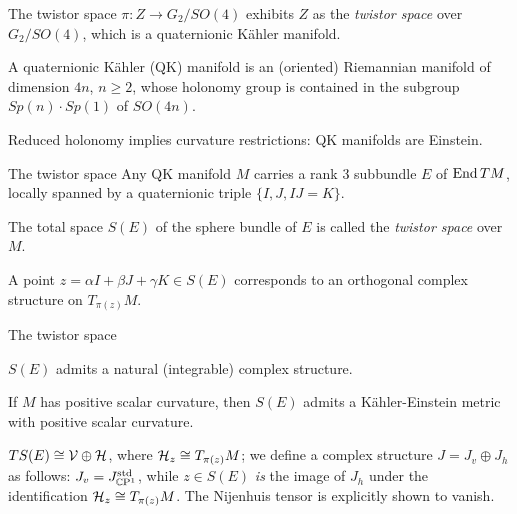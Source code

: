 \documentclass[11pt,parskip]{beamer}
\begin{document}
\begin{frame}{The twistor space}
	$\pi:Z\to G_2/SO(4)$ exhibits $Z$ as the \emph{twistor space} over $G_2/SO(4)$, which is a quaternionic K\"ahler manifold. \pause
	
	\bigskip
	
	\begin{mydef}
		A quaternionic K\"ahler (QK) manifold is an (oriented) Riemannian manifold of dimension $4n$, $n\geq 2$, whose holonomy group is contained in the subgroup $Sp(n)\cdot Sp(1)$ of $SO(4n)$.
	\end{mydef}\pause

	\bigskip

	Reduced holonomy implies curvature restrictions: QK manifolds are Einstein. 
\end{frame}

\begin{frame}{The twistor space}
	Any QK manifold $M$ carries a rank 3 subbundle $E$ of $\operatorname{End} TM$, locally spanned by a quaternionic triple $\{I,J,IJ=K\}$.\pause
	
	\medskip
	
	\begin{mydef}
		The total space $S(E)$ of the sphere bundle of $E$ is called the \emph{twistor space} over $M$.
	\end{mydef}\pause

	\medskip
	
	A point $z=\alpha I+\beta J+ \gamma K \in S(E)$ corresponds to an orthogonal complex structure on $T_{\pi(z)}M$.
\end{frame}

\begin{frame}{The twistor space}
	\begin{thm}
		\begin{numberedlist}
			\item $S(E)$ admits a natural (integrable) complex structure.
			\item If $M$ has positive scalar curvature, then $S(E)$ admits a K\"ahler-Einstein metric with positive scalar curvature.
		\end{numberedlist}
	\end{thm}\pause
	\medskip 
	
	\begin{myproof}[Proof of (i)]
		$TS(E)\cong \mathcal{V}\oplus \mathcal{H}$, where $\mathcal{H}_z\cong T_{\pi(z)}M$; we define a complex structure $J=J_v\oplus J_h$ as follows: $J_v=J^\text{std}_{\mathbb{C}\mathrm{P}^1}$, while $z\in S(E)$ \emph{is} the image of $J_h$ under the identification $\mathcal{H}_z\cong T_{\pi(z)}M$. The Nijenhuis tensor is explicitly shown to vanish.
	\end{myproof}
\end{frame}
\end{document}
